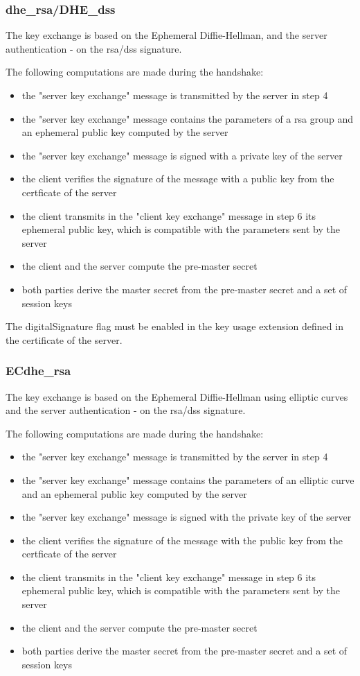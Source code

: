 \subsubsection*{\gls{dhe}\_\gls{rsa}/DHE\_\gls{dss}}
The key exchange is based on the Ephemeral Diffie-Hellman, and the server authentication - on the \gls{rsa}/\gls{dss} signature.

The following computations are made during the handshake:
\begin{itemize}
	\item the "server key exchange" message is transmitted by the server in step 4
	\item the "server key exchange" message contains the parameters of a \gls{rsa} group and an ephemeral public key computed by the server
	\item the "server key exchange" message is signed with a private key of the server
	\item the client verifies the signature of the message with a public key from the certficate of the server
	\item the client transmits in the "client key exchange" message in step 6 its ephemeral public key, which is compatible with the parameters sent by the server
	\item the client and the server compute the pre-master secret
	\item both parties derive the master secret from the pre-master secret and a set of session keys
\end{itemize}

The digitalSignature flag must be enabled in the key usage extension defined in the certificate of the server.

\subsubsection*{EC\gls{dhe}\_\gls{rsa}}
The key exchange is based on the Ephemeral Diffie-Hellman using elliptic curves and the server authentication - on the \gls{rsa}/\gls{dss} signature.

The following computations are made during the handshake:
\begin{itemize}
	\item the "server key exchange" message is transmitted by the server in step 4 
	\item the "server key exchange" message contains the parameters of an elliptic curve and an ephemeral public key computed by the server
	\item the "server key exchange" message is signed with the private key of the server
	\item the client verifies the signature of the message with the public key from the certficate of the server
	\item the client transmits in the "client key exchange" message in step 6 its ephemeral public key, which is compatible with the parameters sent by the server
	\item the client and the server compute the pre-master secret
	\item both parties derive the master secret from the pre-master secret and a set of session keys
\end{itemize}

